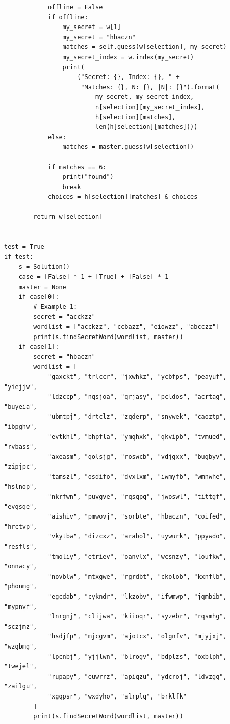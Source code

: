 \documentclass[11pt]{article}
\begin{document}
\begin{verbatim}
            offline = False
            if offline:
                my_secret = w[1]
                my_secret = "hbaczn"
                matches = self.guess(w[selection], my_secret)
                my_secret_index = w.index(my_secret)
                print(
                    ("Secret: {}, Index: {}, " +
                     "Matches: {}, N: {}, |N|: {}").format(
                         my_secret, my_secret_index,
                         n[selection][my_secret_index],
                         h[selection][matches],
                         len(h[selection][matches])))
            else:
                matches = master.guess(w[selection])

            if matches == 6:
                print("found")
                break
            choices = h[selection][matches] & choices

        return w[selection]


test = True
if test:
    s = Solution()
    case = [False] * 1 + [True] + [False] * 1
    master = None
    if case[0]:
        # Example 1:
        secret = "acckzz"
        wordlist = ["acckzz", "ccbazz", "eiowzz", "abcczz"]
        print(s.findSecretWord(wordlist, master))
    if case[1]:
        secret = "hbaczn"
        wordlist = [
            "gaxckt", "trlccr", "jxwhkz", "ycbfps", "peayuf", "yiejjw",
            "ldzccp", "nqsjoa", "qrjasy", "pcldos", "acrtag", "buyeia",
            "ubmtpj", "drtclz", "zqderp", "snywek", "caoztp", "ibpghw",
            "evtkhl", "bhpfla", "ymqhxk", "qkvipb", "tvmued", "rvbass",
            "axeasm", "qolsjg", "roswcb", "vdjgxx", "bugbyv", "zipjpc",
            "tamszl", "osdifo", "dvxlxm", "iwmyfb", "wmnwhe", "hslnop",
            "nkrfwn", "puvgve", "rqsqpq", "jwoswl", "tittgf", "evqsqe",
            "aishiv", "pmwovj", "sorbte", "hbaczn", "coifed", "hrctvp",
            "vkytbw", "dizcxz", "arabol", "uywurk", "ppywdo", "resfls",
            "tmoliy", "etriev", "oanvlx", "wcsnzy", "loufkw", "onnwcy",
            "novblw", "mtxgwe", "rgrdbt", "ckolob", "kxnflb", "phonmg",
            "egcdab", "cykndr", "lkzobv", "ifwmwp", "jqmbib", "mypnvf",
            "lnrgnj", "clijwa", "kiioqr", "syzebr", "rqsmhg", "sczjmz",
            "hsdjfp", "mjcgvm", "ajotcx", "olgnfv", "mjyjxj", "wzgbmg",
            "lpcnbj", "yjjlwn", "blrogv", "bdplzs", "oxblph", "twejel",
            "rupapy", "euwrrz", "apiqzu", "ydcroj", "ldvzgq", "zailgu",
            "xgqpsr", "wxdyho", "alrplq", "brklfk"
        ]
        print(s.findSecretWord(wordlist, master))

\end{verbatim}
\end{document}
